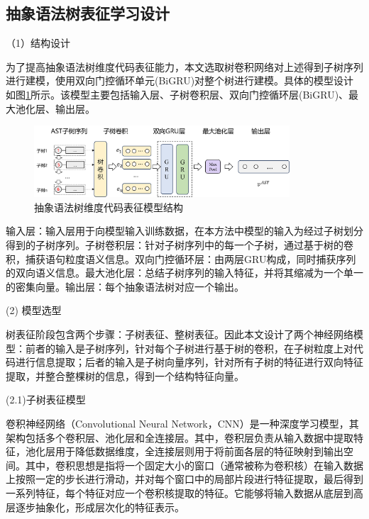 
\subsection{抽象语法树表征学习设计}
\label{subsec:ASTModel}
（1）结构设计

为了提高抽象语法树维度代码表征能力，本文选取树卷积网络对上述得到子树序列进行建模，使用双向门控循环单元(BiGRU)对整个树进行建模。具体的模型设计如图\ref{fig:astmodel}所示。该模型主要包括输入层、子树卷积层、双向门控循环层(BiGRU)、最大池化层、输出层。
\begin{figure}[H]
  \centering
  \includegraphics[width=0.85\textwidth]{figures/astmodel.png}
  \caption{抽象语法树维度代码表征模型结构}\label{fig:astmodel}
\end{figure}

输入层：输入层用于向模型输入训练数据，在本方法中模型的输入为经过子树划分得到的子树序列。子树卷积层：针对子树序列中的每一个子树，通过基于树的卷积，捕获语句粒度语义信息。双向门控循环层：由两层GRU构成，同时捕获序列的双向语义信息。最大池化层：总结子树序列的输入特征，并将其缩减为一个单一的密集向量。输出层：每个抽象语法树对应一个输出。

(2) 模型选型

树表征阶段包含两个步骤：子树表征、整树表征。因此本文设计了两个神经网络模型：前者的输入是子树序列，针对每个子树进行基于树的卷积，在子树粒度上对代码进行信息提取；后者的输入是子树向量序列，针对所有子树的特征进行双向特征提取，并整合整棵树的信息，得到一个结构特征向量。

(2.1)子树表征模型

卷积神经网络（Convolutional Neural Network，CNN）是一种深度学习模型，其架构包括多个卷积层、池化层和全连接层。其中，卷积层负责从输入数据中提取特征，池化层用于降低数据维度，全连接层则用于将前面各层的特征映射到输出空间。其中，卷积思想是指将一个固定大小的窗口（通常被称为卷积核）在输入数据上按照一定的步长进行滑动，并对每个窗口中的局部片段进行特征提取，最后得到一系列特征，每个特征对应一个卷积核提取的特征。它能够将输入数据从底层到高层逐步抽象化，形成层次化的特征表示。

